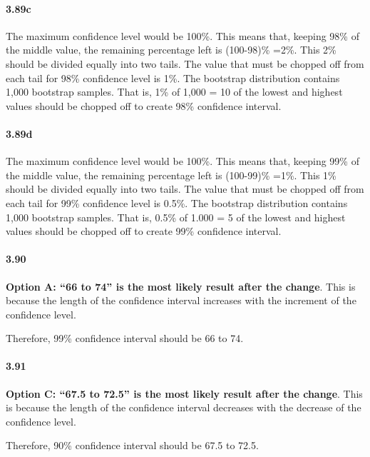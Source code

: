 \documentclass[
]{article}
\begin{document}
\hypertarget{c-10}{%
\paragraph{3.89c}\label{c-10}}

The maximum confidence level would be 100\%. This means that, keeping
98\% of the middle value, the remaining percentage left is (100-98)\%
=2\%. This 2\% should be divided equally into two tails. The value that
must be chopped off from each tail for 98\% confidence level is 1\%. The
bootstrap distribution contains 1,000 bootstrap samples. That is, 1\% of
1,000 = 10 of the lowest and highest values should be chopped off to
create 98\% confidence interval.

\hypertarget{d-7}{%
\paragraph{3.89d}\label{d-7}}

The maximum confidence level would be 100\%. This means that, keeping
99\% of the middle value, the remaining percentage left is (100-99)\%
=1\%. This 1\% should be divided equally into two tails. The value that
must be chopped off from each tail for 99\% confidence level is 0.5\%.
The bootstrap distribution contains 1,000 bootstrap samples. That is,
0.5\% of 1.000 = 5 of the lowest and highest values should be chopped
off to create 99\% confidence interval.

\hypertarget{section-4}{%
\paragraph{3.90}\label{section-4}}

\textbf{Option A: ``66 to 74'' is the most likely result after the
change}. This is because the length of the confidence interval increases
with the increment of the confidence level.

Therefore, 99\% confidence interval should be 66 to 74.

\hypertarget{section-5}{%
\paragraph{3.91}\label{section-5}}

\textbf{Option C: ``67.5 to 72.5'' is the most likely result after the
change}. This is because the length of the confidence interval decreases
with the decrease of the confidence level.

Therefore, 90\% confidence interval should be 67.5 to 72.5.
\end{document}

